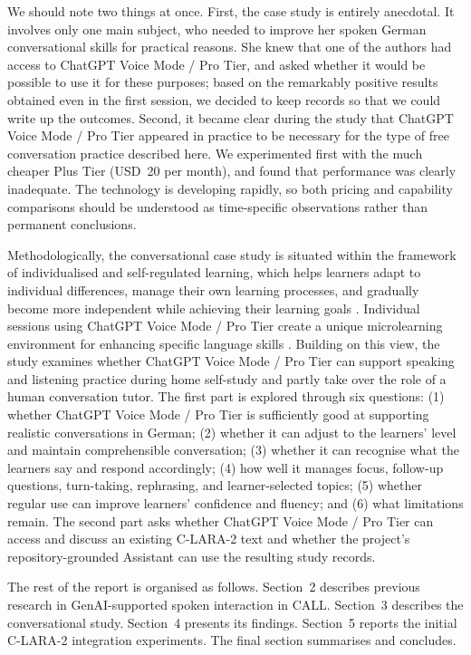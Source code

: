 \documentclass[11pt,a4paper]{article}
\begin{document}
We should note two things at once. First, the case study is entirely anecdotal. It involves only one main subject, who needed to improve her spoken German conversational skills for practical reasons. She knew that one of the authors had access to ChatGPT Voice Mode / Pro Tier, and asked whether it would be possible to use it for these purposes; based on the remarkably positive results obtained even in the first session, we decided to keep records so that we could write up the outcomes. Second, it became clear during the study that ChatGPT Voice Mode / Pro Tier appeared in practice to be necessary for the type of free conversation practice described here. We experimented first with the much cheaper Plus Tier (USD~20 per month), and found that performance was clearly inadequate. The technology is developing rapidly, so both pricing and capability comparisons should be understood as time-specific observations rather than permanent conclusions.

Methodologically, the conversational case study is situated within the framework of individualised and self-regulated learning, which helps learners adapt to individual differences, manage their own learning processes, and gradually become more independent while achieving their learning goals \citep{Zimmerman2002}. Individual sessions using ChatGPT Voice Mode / Pro Tier create a unique microlearning environment for enhancing specific language skills \citep{KohnkeMoorhouse2026}. Building on this view, the study examines whether ChatGPT Voice Mode / Pro Tier can support speaking and listening practice during home self-study and partly take over the role of a human conversation tutor. The first part is explored through six questions: (1) whether ChatGPT Voice Mode / Pro Tier is sufficiently good at supporting realistic conversations in German; (2) whether it can adjust to the learners' level and maintain comprehensible conversation; (3) whether it can recognise what the learners say and respond accordingly; (4) how well it manages focus, follow-up questions, turn-taking, rephrasing, and learner-selected topics; (5) whether regular use can improve learners' confidence and fluency; and (6) what limitations remain. The second part asks whether ChatGPT Voice Mode / Pro Tier can access and discuss an existing C-LARA-2 text and whether the project's repository-grounded Assistant can use the resulting study records.

The rest of the report is organised as follows. Section~2 describes previous research in GenAI-supported spoken interaction in CALL. Section~3 describes the conversational study. Section~4 presents its findings. Section~5 reports the initial C-LARA-2 integration experiments. The final section summarises and concludes.
\end{document}
